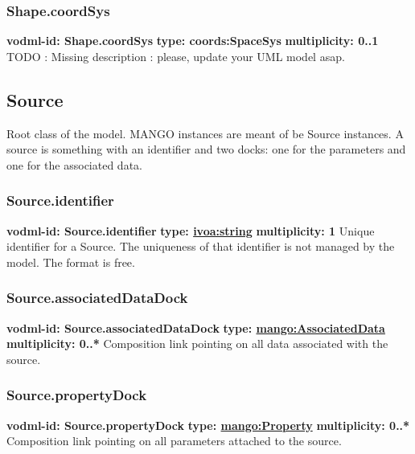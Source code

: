 {    \subsubsection{Shape.coordSys}
      \textbf{vodml-id: Shape.coordSys} \newline
      \textbf{type: coords:SpaceSys} \newline
      \textbf{multiplicity: 0..1} \newline 
      TODO : Missing description : please, update your UML model asap.

  \subsection{Source}
  \label{sect:Source}
    Root class of the model. MANGO instances are meant of be Source instances. A source is something with an identifier and two docks: one for the parameters and one for the associated data.

    \subsubsection{Source.identifier}
      \textbf{vodml-id: Source.identifier} \newline
      \textbf{type: \hyperref[sect:ivoa]{ivoa:string}} \newline
      \textbf{multiplicity: 1} \newline 
      Unique identifier for a Source. The uniqueness of that identifier is not managed by the model. The format is free.

    \subsubsection{Source.associatedDataDock}
      \textbf{vodml-id: Source.associatedDataDock} \newline
      \textbf{type: \hyperref[sect:AssociatedData]{mango:AssociatedData}} \newline
      \textbf{multiplicity: 0..*} \newline 
      Composition link pointing on all data associated with the source.

    \subsubsection{Source.propertyDock}
      \textbf{vodml-id: Source.propertyDock} \newline
      \textbf{type: \hyperref[sect:Property]{mango:Property}} \newline
      \textbf{multiplicity: 0..*} \newline 
      Composition link pointing on all parameters attached to the source.

}
